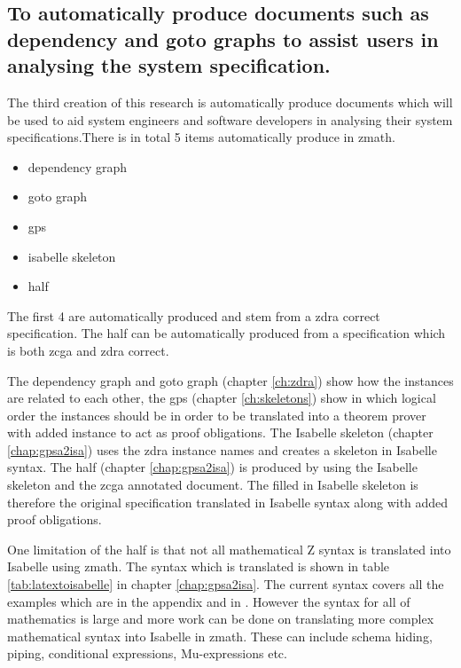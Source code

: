 \subsection{To automatically produce documents such as dependency and goto graphs to assist users in analysing the system specification.}

The third creation of this research is automatically produce documents which
will be used to aid system engineers and software developers in analysing their
system specifications.There is in total 5 items automatically produce in
\gls{zmath}.

\begin{itemize}
\item dependency graph

\item goto graph

\item \gls{gps}

\item isabelle skeleton

\item \gls{half}
\end{itemize}

The first 4 are automatically produced and stem from a \gls{zdra} correct
specification. The \gls{half} can be automatically produced from a specification
which is both \gls{zcga} and \gls{zdra} correct.

The dependency graph and goto graph (chapter \ref{ch:zdra}) show how the
instances are related to each other, the \gls{gps} (chapter \ref{ch:skeletons})
show in which logical order the instances should be in order to be translated
into a theorem prover with added instance to act as proof obligations. The
Isabelle skeleton (chapter \ref{chap:gpsa2isa}) uses the \gls{zdra} instance
names and creates a skeleton in Isabelle syntax. The \gls{half} (chapter
\ref{chap:gpsa2isa}) is produced by using the Isabelle skeleton and the
\gls{zcga} annotated document. The filled in Isabelle skeleton is therefore the
original specification translated in Isabelle syntax along with added proof
obligations.

One limitation of the \gls{half} is that not all mathematical Z syntax is
translated into Isabelle using \gls{zmath}. The syntax which is translated is
shown in table \ref{tab:latextoisabelle} in chapter \ref{chap:gpsa2isa}. The
current syntax covers all the examples which are in the appendix and in
\cite{mathlangexamples}. However the syntax for all of mathematics is large and
more work can be done on translating more complex mathematical syntax into
Isabelle in \gls{zmath}. These can include schema hiding, piping, conditional
expressions, Mu-expressions \cite{zrefcard} etc.

